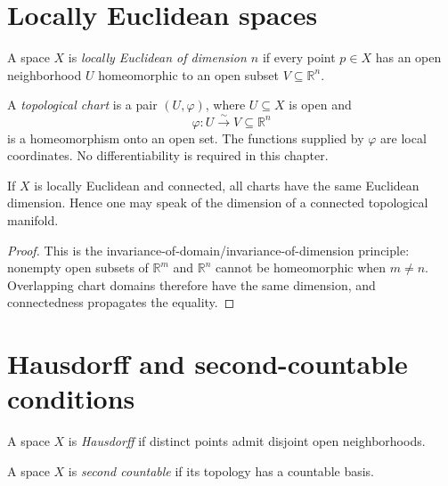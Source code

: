 \section{Locally Euclidean spaces}
\begin{definition}\label{def:vii01-locally-euclidean}
A space \(X\) is \emph{locally Euclidean of dimension \(n\)} if every point \(p\in X\) has an open neighborhood \(U\) homeomorphic to an open subset \(V\subseteq\mathbb R^n\).
\end{definition}

\begin{definition}\label{def:vii01-chart}
A \emph{topological chart} is a pair \((U,\varphi)\), where \(U\subseteq X\) is open and
\[
\varphi:U\xrightarrow{\sim}V\subseteq\mathbb R^n
\]
is a homeomorphism onto an open set.  The functions supplied by \(\varphi\) are local coordinates.  No differentiability is required in this chapter.
\end{definition}

\begin{proposition}\label{prop:vii01-dimension-local}
If \(X\) is locally Euclidean and connected, all charts have the same Euclidean dimension.  Hence one may speak of the dimension of a connected topological manifold.
\end{proposition}
\begin{proof}
This is the invariance-of-domain/invariance-of-dimension principle: nonempty open subsets of \(\mathbb R^m\) and \(\mathbb R^n\) cannot be homeomorphic when \(m\neq n\).  Overlapping chart domains therefore have the same dimension, and connectedness propagates the equality.
\end{proof}

\section{Hausdorff and second-countable conditions}
\begin{definition}[Hausdorff]\label{def:vii01-hausdorff}
A space \(X\) is \emph{Hausdorff} if distinct points admit disjoint open neighborhoods.
\end{definition}

\begin{definition}\label{def:vii01-second-countable}
A space \(X\) is \emph{second countable} if its topology has a countable basis.
\end{definition}

